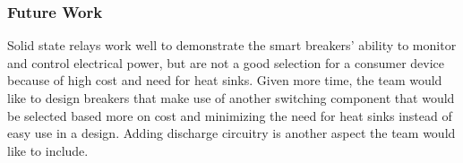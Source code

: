 \subsubsection{Future Work}
Solid state relays work well to demonstrate the smart breakers' ability to monitor and control electrical power, but are not a good selection for a consumer device because of high cost and need for heat sinks. Given more time, the team would like to design breakers that make use of another switching component that would be selected based more on cost and minimizing the need for heat sinks instead of easy use in a design. Adding discharge circuitry is another aspect the team would like to include. 
